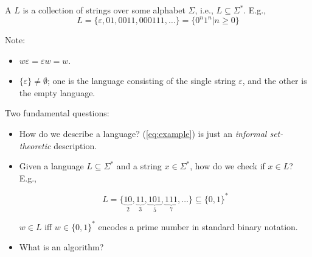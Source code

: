 \begin{frame}
A  $L$ is a collection of strings over some
alphabet $\Sigma$, i.e.,  $L\subseteq\Sigma^*$. E.g.,
\begin{equation}\label{eq:example}
L=\{\varepsilon,01,0011,000111,\ldots\}=\{0^n1^n|n\ge 0\}
\end{equation}

Note:

\begin{itemize}
\item  $w\varepsilon=\varepsilon w=w$.

\item $\{\varepsilon\}\neq\emptyset$; one is the language
consisting of the single string $\varepsilon$, and the other is the
empty language.

\end{itemize}
\end{frame}

\begin{frame}
Two fundamental questions:
\begin{itemize}
\item  How do we describe a language?  (\ref{eq:example}) is just an
{\em informal set-theoretic} description.

\item  Given a language $L\subseteq\Sigma^*$ and a string
$x\in\Sigma^*$, how do we check if $x\in L$?  E.g.,

$$
L=\{\underbrace{10}_2,\underbrace{11}_3,\underbrace{101}_5,
\underbrace{111}_7,\ldots\}\subseteq\{0,1\}^*
$$

$w\in L$ iff $w\in\{0,1\}^*$ encodes a prime number in standard binary
notation.

\item What is an algorithm?
\end{itemize}
\end{frame}


